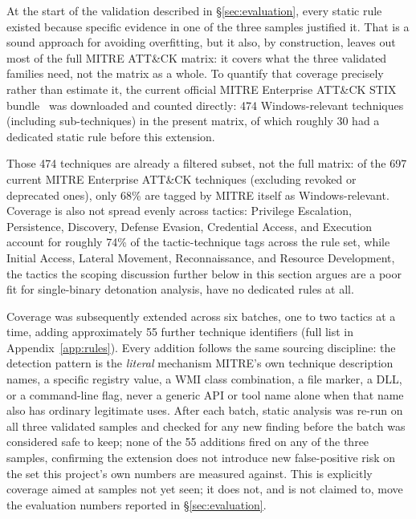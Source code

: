 At the start of the validation described in \S\ref{sec:evaluation},
every static rule existed because specific evidence in one of the
three samples justified it. That is a sound approach for avoiding
overfitting, but it also, by construction, leaves out most of the
full MITRE ATT\&CK matrix: it covers what the three validated
families need, not the matrix as a whole. To quantify that coverage
precisely rather than estimate it, the current official MITRE Enterprise ATT\&CK STIX
bundle~\cite{mitre-attack-stix} was downloaded and counted directly:
474 Windows-relevant techniques (including sub-techniques) in the
present matrix, of which roughly 30 had a dedicated static rule before
this extension.

Those 474 techniques are already a filtered subset, not the full
matrix: of the 697 current MITRE Enterprise ATT\&CK techniques
(excluding revoked or deprecated ones), only 68\% are tagged by MITRE
itself as Windows-relevant. Coverage is also not spread evenly across
tactics: Privilege Escalation, Persistence, Discovery, Defense Evasion,
Credential Access, and Execution account for roughly 74\% of the
tactic-technique tags across the rule set, while Initial Access,
Lateral Movement, Reconnaissance, and Resource Development, the
tactics the scoping discussion further below in this section argues
are a poor fit for single-binary detonation analysis, have no
dedicated rules at all.

Coverage was subsequently extended across six batches, one to two
tactics at a time, adding approximately 55 further technique
identifiers (full list in Appendix~\ref{app:rules}). Every addition
follows the same sourcing discipline: the detection pattern is the
\emph{literal} mechanism MITRE's own technique description names, a
specific registry value, a WMI class combination, a file marker, a
DLL, or a command-line flag, never a generic API or tool name alone
when that name also has ordinary legitimate uses. After each batch,
static analysis was re-run on all three validated samples and checked
for any new finding before the batch was considered safe to keep;
none of the 55 additions fired on any of the three samples, confirming
the extension does not introduce new false-positive risk on the set
this project's own numbers are measured against. This is explicitly
coverage aimed at samples not yet seen; it does not, and is not
claimed to, move the evaluation numbers reported in
\S\ref{sec:evaluation}.

